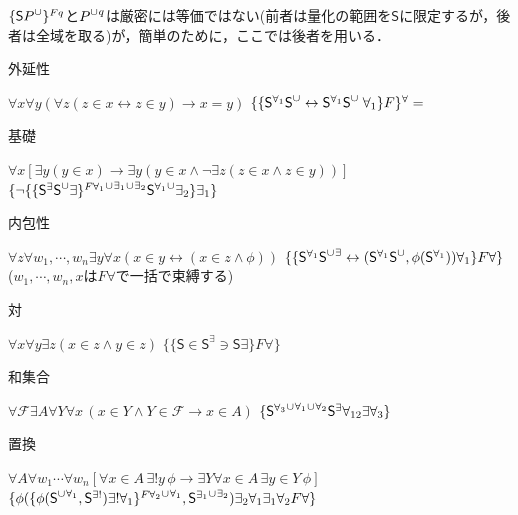 \documentclass[../../main-detail.tex]{subfiles}
\begin{document}
\begin{remark}
    $\{\mathsf S\clsop{P}\}^{Fq}$と$\clsop{P}^{q}$は厳密には等価ではない(前者は量化の範囲を$\mathsf S$に限定するが，後者は全域を取る)が，簡単のために，ここでは後者を用いる．
\end{remark}
\begin{exe}
    \ex 外延性
    \begin{xlist}
        \ex $\forall x \forall y(\forall z (z \in x \leftrightarrow z \in y) \to x = y)$
        \ex $\{\{\mathsf S^{\forall_1} \clsop{\mathsf S} \leftrightarrow \mathsf S^{\forall_1} \clsop{\mathsf S}\;\forall_1\}F\}^\forall =$ 
    \end{xlist}
    \ex 基礎
    \begin{xlist}
        \ex $\forall x[\exists y(y \in x) \to \exists y(y\in x \land \lnot \exists z(z \in x \land z \in y))]$
        \ex $\{\lnot\{\clsop{\clsop{\{\mathsf S^\exists \clsop{\mathsf S} \exists\}^{F\forall_1}}^{\exists_1}}^{\exists_2}\clsop{\mathsf S^{\forall_1}}\exists_2\}\exists_1\}$
    \end{xlist}
    \ex 内包性
    \begin{xlist}
        \ex $\forall z\forall w_1,\cdots,w_n\exists y\forall x(x \in y \leftrightarrow (x \in z \land \phi))$
        \ex $\{\{\mathsf S^{\forall_1} \clsop{\mathsf S}^\exists \leftrightarrow (\mathsf S^{\forall_1} \clsop{\mathsf S},\phi(\mathsf S^{\forall_1})) \forall_1\}F\forall\}$
        \glt ($w_1,\cdots,w_n,x$は$F\forall$で一括で束縛する)
    \end{xlist}
    \ex 対
    \begin{xlist}
        \ex $\forall x \forall y \exists z (x \in z \land y \in z)$
        \ex $\{\{\mathsf S \in \mathsf S^{\exists} \ni \mathsf S \exists\}F\forall\}$
    \end{xlist}
    \ex 和集合
    \begin{xlist}
        \ex $\forall \mathcal{F} \exists A \forall Y \forall x\,(x \in Y \land Y \in \mathcal{F} \to x \in A)$
        \ex $\{\clsop{\clsop{\mathsf S^{\forall_3}}^{\forall_1}}^{\forall_2} \mathsf S^{\exists} \forall_{12}\exists\forall_3\}$
    \end{xlist}
    \ex 置換
    \begin{xlist}
        \ex $\forall A \forall w_1 \cdots \forall w_n
        \left[
            \forall x \in A\, \exists! y\,\phi
            \to
            \exists Y \forall x \in A\,\exists y \in Y\,\phi
        \right]$
        \ex $\{\phi(\clsop{\{\phi(\clsop{\mathsf S}^{\forall_1},\mathsf S^{\exists !})\exists ! \forall_1\}^{F\forall_2}}^{\forall_1}, \clsop{\mathsf S^{\exists_1}}^{\exists_2})\exists_{2}\forall_1\exists_{1}\forall_2 F\forall\}$

\end{xlist}
\end{exe}
\end{document}
